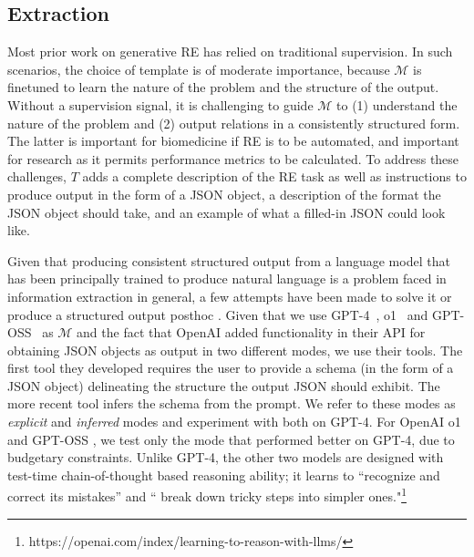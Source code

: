 \documentclass[11pt]{article}
\begin{document}
\subsection{Extraction}
Most prior work on generative RE has relied on traditional supervision. In such scenarios, the choice of template is of moderate importance, because $\mathcal{M}$ is finetuned to learn the nature of the problem and the structure of the output. Without a supervision signal, it is challenging to guide $\mathcal{M}$ to (1) understand the nature of the problem and (2) output relations in a consistently structured form. The latter is important for biomedicine if RE is to be automated, and important for research as it permits performance metrics to be calculated. To address these challenges, $T$ adds a complete description of the RE task as well as instructions to produce output in the form of a JSON object, a description of the format the JSON object should take, and an example of what a filled-in JSON could look like.

Given that producing consistent structured output from a language model that has been principally trained to produce natural language is a problem faced in information extraction in general, a few attempts have been made to solve it \cite{clownfish2023, jsonformer} or produce a structured output posthoc \cite{kor}.  Given that we use GPT-4~\cite{openai2023gpt4}, o1~\cite{jaech2024openai} and GPT-OSS~\cite{openai2025gptoss120bgptoss20bmodel} as $\mathcal{M}$ and the fact that OpenAI  added functionality in their API for obtaining JSON objects as output in two different modes, we use their tools.  The first tool they developed requires the user to provide a schema (in the form of a JSON object) delineating the structure the output JSON should exhibit.  The more recent tool infers the schema from the prompt.  We refer to these modes as \emph{explicit} and \emph{inferred} modes and experiment with both on GPT-4. For OpenAI o1 and GPT-OSS \cite{jaech2024openai, openai2025gptoss120bgptoss20bmodel}, we test only the mode that performed better on GPT-4, due to budgetary constraints. Unlike GPT-4, the other two models are designed with test-time chain-of-thought based reasoning ability; it learns to ``recognize and correct its mistakes''  and `` break down tricky steps into simpler ones."\footnote{https://openai.com/index/learning-to-reason-with-llms/}

\end{document}
